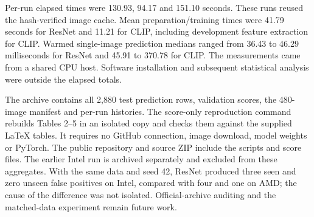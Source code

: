 Per-run elapsed times were 130.93, 94.17 and 151.10 seconds. These runs reused the hash-verified image cache. Mean preparation/training times were 41.79 seconds for ResNet and 11.21 for CLIP, including development feature extraction for CLIP. Warmed single-image prediction medians ranged from 36.43 to 46.29 milliseconds for ResNet and 45.91 to 370.78 for CLIP. The measurements came from a shared CPU host. Software installation and subsequent statistical analysis were outside the elapsed totals.

The archive contains all 2,880 test prediction rows, validation scores, the 480-image manifest and per-run histories. The score-only reproduction command rebuilds Tables 2--5 in an isolated copy and checks them against the supplied LaTeX tables. It requires no GitHub connection, image download, model weights or PyTorch. The public repository and source ZIP include the scripts and score files. The earlier Intel run is archived separately and excluded from these aggregates. With the same data and seed 42, ResNet produced three seen and zero unseen false positives on Intel, compared with four and one on AMD; the cause of the difference was not isolated. Official-archive auditing and the matched-data experiment remain future work.
\FloatBarrier
